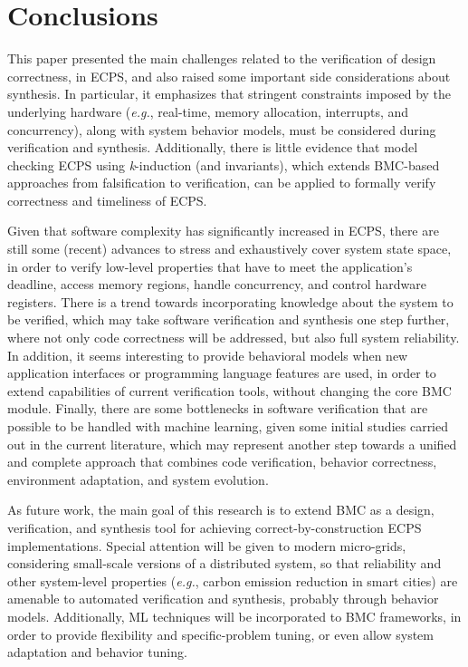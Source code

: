 \documentclass{cta-author}
\begin{document}
{{		%
		\section{Conclusions}
		\label{conclusions}
		
		This paper presented the main challenges related to the verification of design correctness, in ECPS, and also raised some important side considerations about synthesis. In particular, it emphasizes that stringent constraints imposed by the underlying hardware ({\it e.g.}, real-time, memory allocation, interrupts, and concurrency), along with system behavior models, must be considered during verification and synthesis. Additionally, there is little evidence that model checking ECPS using \textit{k}-induction (and invariants), which extends BMC-based approaches from falsification to verification, can be applied to formally verify correctness and timeliness of ECPS. 
		
		Given that software complexity has significantly increased in ECPS, there are still some (recent) advances to stress and exhaustively cover system state space, in order to verify low-level properties that have to meet the application's deadline, access memory regions, handle concurrency, and control hardware registers. There is a trend towards incorporating knowledge about the system to be verified, which may take software verification and synthesis one step further, where not only code correctness will be addressed, but also full system reliability. In addition, it seems interesting to provide behavioral models when new application interfaces or programming language features are used, in order to extend capabilities of current verification tools, without changing the core BMC module. Finally, there are some bottlenecks in software verification that are possible to be handled with machine learning, given some initial studies carried out in the current literature, which may represent another step towards a unified and complete approach that combines code verification, behavior correctness, environment adaptation, and system evolution.
		
		As future work, the main goal of this research is to extend BMC as a design, verification, and synthesis tool for achieving correct-by-construction ECPS implementations. Special attention will be given to modern micro-grids, considering small-scale versions of a distributed system, so that reliability and other system-level properties ({\it e.g.}, carbon emission reduction in smart cities) are amenable to automated verification and synthesis, probably through behavior models. Additionally, ML techniques will be incorporated to BMC frameworks, in order to provide flexibility and specific-problem tuning, or even allow system adaptation and behavior tuning.

}}
\end{document}

